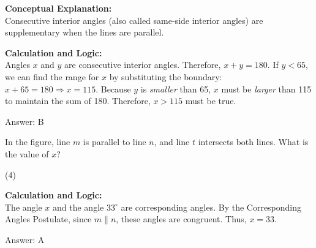 \documentclass[11pt,paper=a4,answers]{exam}
\begin{document}
\begin{questions}
\begin{solution}
\textbf{Conceptual Explanation:} \\
Consecutive interior angles (also called same-side interior angles) are supplementary when the lines are parallel.

\vspace{30pt}

\textbf{Calculation and Logic:} \\
Angles $x$ and $y$ are consecutive interior angles. Therefore, $x + y = 180$. If $y < 65$, we can find the range for $x$ by substituting the boundary: $x + 65 = 180 \Rightarrow x = 115$. Because $y$ is \textit{smaller} than 65, $x$ must be \textit{larger} than 115 to maintain the sum of 180. Therefore, $x > 115$ must be true.

\vspace{30pt}

Answer: \colorbox{yellow!100}{B}
\end{solution}

\vspace{60pt}

\question
\begin{center}
\end{center}
In the figure, line $m$ is parallel to line $n$, and line $t$ intersects both lines. What is the value of $x$?
\begin{tasks}(4)
\end{tasks}

\begin{solution}
\textbf{Calculation and Logic:} \\
The angle $x$ and the angle $33^\circ$ are corresponding angles. By the Corresponding Angles Postulate, since $m \parallel n$, these angles are congruent. Thus, $x = 33$.

\vspace{30pt}

Answer: \colorbox{yellow!100}{A}
\end{solution}

\vspace{60pt}


\end{questions}
\end{document}
